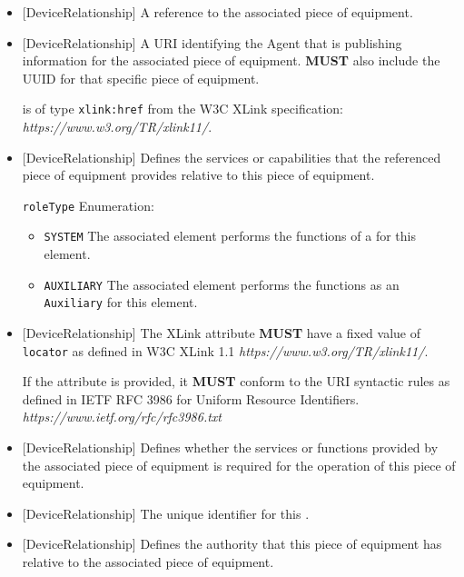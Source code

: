 \begin{itemize}

\item {}[DeviceRelationship] \newline A reference to the associated piece of equipment. 


\item {}[DeviceRelationship] \newline A URI identifying the \gls{Agent} that is publishing information for the associated piece of equipment.  \textbf{MUST} also include the UUID for that specific piece of equipment.

 is of type \texttt{xlink:href} from the W3C XLink specification: \textit{https://www.w3.org/TR/xlink11/}.

\item {}[DeviceRelationship] \newline Defines the services or capabilities that the referenced piece of equipment provides relative to this piece of equipment.

\texttt{roleType} Enumeration:

\begin{itemize}
\item \texttt{SYSTEM} \newline The associated element performs the functions of a  for this element. 
\item \texttt{AUXILIARY} \newline The associated element performs the functions as an \texttt{Auxiliary} for this element. 
\end{itemize}


\item {}[DeviceRelationship] \newline The XLink  attribute \textbf{MUST} have a fixed value of \texttt{locator} as defined in W3C XLink 1.1 \textit{https://www.w3.org/TR/xlink11/}.

If the  attribute is provided, it \textbf{MUST} conform to the URI syntactic rules as defined in IETF RFC 3986 for Uniform Resource Identifiers. \textit{https://www.ietf.org/rfc/rfc3986.txt}

\item {}[DeviceRelationship] \newline Defines whether the services or functions provided by the associated piece of equipment is required for the operation of this piece of equipment.

\item {}[DeviceRelationship] \newline The unique identifier for this .

\item {}[DeviceRelationship] \newline Defines the authority that this piece of equipment has relative to the associated piece of equipment.
\end{itemize}

